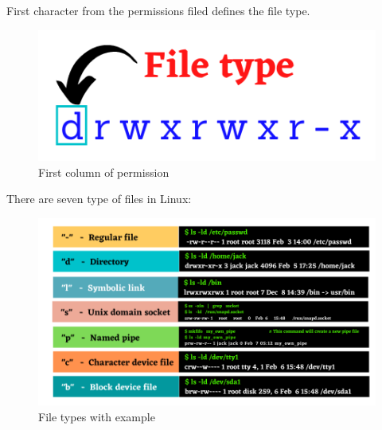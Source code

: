 \setlength{\columnsep}{3pt}
\begin{flushleft}

	First character from the permissions filed defines the file type. 
	
	\begin{figure}[h!]
		\centering
		\includegraphics[scale=0.8]{content/chapter5/images/file_type1.png}
		\caption{First column of permission}
		\label{fig:First column permission}
	\end{figure}
	
	
	There are seven type of files in Linux:

	\begin{figure}[h!]
		\centering
		\includegraphics[scale=0.65]{content/chapter5/images/perm.png}
		\caption{File types with example}
		\label{fig:Sample_permission2}
	\end{figure}
	
\end{flushleft}

\newpage

